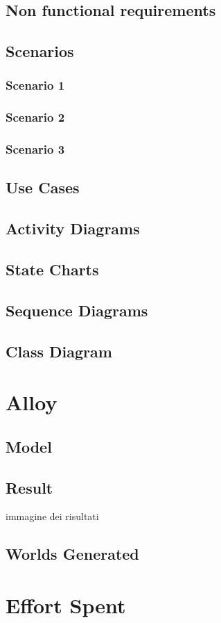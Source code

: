 \documentclass{article}
\begin{document}
\subsection{Non functional requirements}


\subsection{Scenarios}
\subsubsection{Scenario 1}

\subsubsection{Scenario 2}

\subsubsection{Scenario 3}

\clearpage
\subsection{Use Cases}



\clearpage
\subsection{Activity Diagrams}


\clearpage
\subsection{State Charts}


\clearpage
\subsection{Sequence Diagrams}


\clearpage
\subsection{Class Diagram}


\clearpage
\section{Alloy}
\subsection{Model}


\subsection{Result}
\begin{center}
	
	immagine dei risultati
\end{center}
\subsection{Worlds Generated}

\section{Effort Spent}
\end{document}
